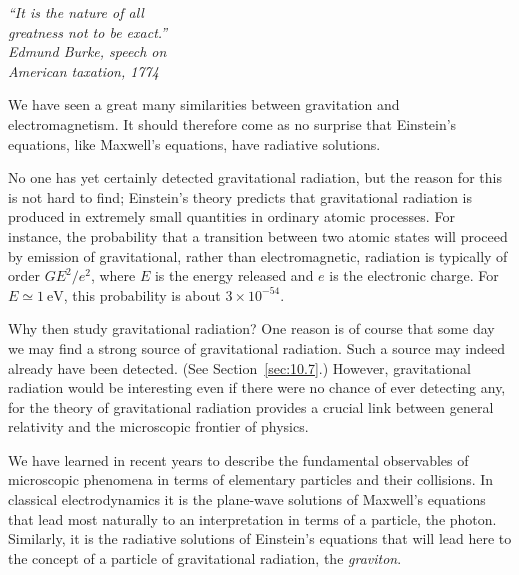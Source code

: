 
\begin{flushright}
\begin{minipage}{0.42\textwidth}
\itshape
``It is the nature of all\\
greatness not to be exact.''\\
Edmund Burke, speech on\\
American taxation, 1774
\end{minipage}
\end{flushright}

We have seen a great many similarities between gravitation and
electromagnetism. It should therefore come as no surprise that Einstein's
equations, like Maxwell's equations, have radiative solutions.

No one has yet certainly detected gravitational radiation, but the reason for
this is not hard to find; Einstein's theory predicts that gravitational
radiation is produced in extremely small quantities in ordinary atomic
processes. For instance, the probability that a transition between two atomic
states will proceed by emission of gravitational, rather than electromagnetic,
radiation is typically of order \(GE^2/e^2\), where \(E\) is the energy
released and \(e\) is the electronic charge. For \(E\simeq1\ \mathrm{eV}\),
this probability is about \(3\times10^{-54}\).

Why then study gravitational radiation? One reason is of course that some day
we may find a strong source of gravitational radiation. Such a source may
indeed already have been detected. (See Section~\ref{sec:10.7}.) However,
gravitational radiation would be interesting even if there were no chance of
ever detecting any, for the theory of gravitational radiation provides a
crucial link between general relativity and the microscopic frontier of
physics.

We have learned in recent years to describe the fundamental observables of
microscopic phenomena in terms of elementary particles and their collisions.
In classical electrodynamics it is the plane-wave solutions of Maxwell's
equations that lead most naturally to an interpretation in terms of a
particle, the photon. Similarly, it is the radiative solutions of Einstein's
equations that will lead here to the concept of a particle of gravitational
radiation, the \emph{graviton}.

